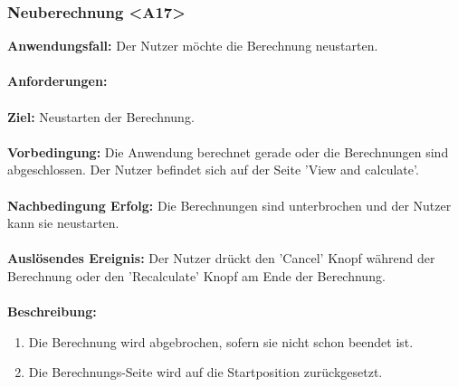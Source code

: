 \documentclass[parskip=full]{scrartcl} %
\begin{document}
\subsubsection*{Neuberechnung <A17>}
\textbf{Anwendungsfall:}  Der Nutzer möchte die Berechnung neustarten.\\\\
\textbf{Anforderungen:} \\\\
\textbf{Ziel:} Neustarten der Berechnung.\\\\
\textbf{Vorbedingung:} Die Anwendung berechnet gerade oder die Berechnungen sind abgeschlossen. Der Nutzer befindet sich auf der Seite 'View and calculate'.\\\\
\textbf{Nachbedingung Erfolg:} Die Berechnungen sind unterbrochen und der Nutzer kann sie neustarten.\\\\
\textbf{Auslösendes Ereignis:} Der Nutzer drückt den 'Cancel' Knopf während der Berechnung oder den 'Recalculate' Knopf am Ende der Berechnung.\\\\
\textbf{Beschreibung:}
\begin{enumerate}
    \item Die Berechnung wird abgebrochen, sofern sie nicht schon beendet ist.
    \item Die Berechnungs-Seite wird auf die Startposition zurückgesetzt.
\end{enumerate}
\newpage
\end{document}
